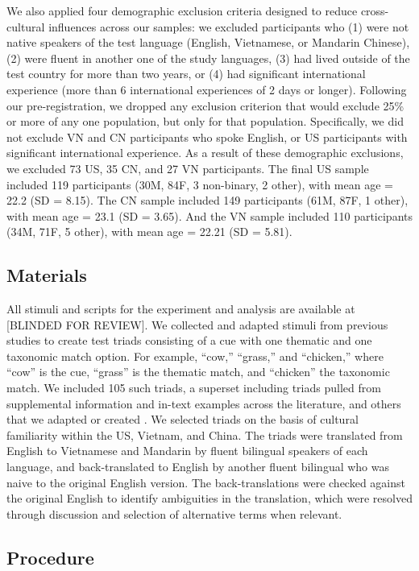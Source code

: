 \documentclass[10pt, letterpaper]{article}
\begin{document}
We also applied four demographic exclusion criteria designed to reduce
cross-cultural influences across our samples: we excluded participants
who (1) were not native speakers of the test language (English,
Vietnamese, or Mandarin Chinese), (2) were fluent in another one of the
study languages, (3) had lived outside of the test country for more than
two years, or (4) had significant international experience (more than 6
international experiences of 2 days or longer). Following our
pre-registration, we dropped any exclusion criterion that would exclude
25\% or more of any one population, but only for that population.
Specifically, we did not exclude VN and CN participants who spoke
English, or US participants with significant international experience.
As a result of these demographic exclusions, we excluded 73 US, 35 CN,
and 27 VN participants. The final US sample included 119 participants
(30M, 84F, 3 non-binary, 2 other), with mean age = 22.2 (SD = 8.15). The
CN sample included 149 participants (61M, 87F, 1 other), with mean age =
23.1 (SD = 3.65). And the VN sample included 110 participants (34M, 71F,
5 other), with mean age = 22.21 (SD = 5.81).

\hypertarget{materials}{%
\subsection{Materials}\label{materials}}

All stimuli and scripts for the experiment and analysis are available at
{[}BLINDED FOR REVIEW{]}. We collected and adapted stimuli from previous
studies to create test triads consisting of a cue with one thematic and
one taxonomic match option. For example, ``cow,'' ``grass,'' and
``chicken,'' where ``cow'' is the cue, ``grass'' is the thematic match,
and ``chicken'' the taxonomic match. We included 105 such triads, a
superset including triads pulled from supplemental information and
in-text examples across the literature, and others that we adapted or
created . We selected triads on the basis of cultural familiarity within
the US, Vietnam, and China. The triads were translated from English to
Vietnamese and Mandarin by fluent bilingual speakers of each language,
and back-translated to English by another fluent bilingual who was naive
to the original English version. The back-translations were checked
against the original English to identify ambiguities in the translation,
which were resolved through discussion and selection of alternative
terms when relevant.

\hypertarget{procedure}{%
\subsection{Procedure}\label{procedure}}
\end{document}
